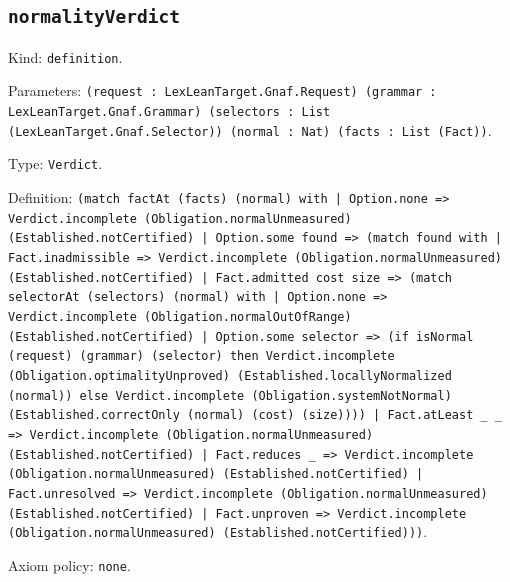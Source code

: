 \documentclass[11pt]{article}
\begin{document}
\subsection*{\texttt{normalityVerdict}}
\noindent Kind: \texttt{definition}.\par
\noindent Parameters: \texttt{(request : LexLeanTarget.Gnaf.Request) (grammar : LexLeanTarget.Gnaf.Grammar) (selectors : List (LexLeanTarget.Gnaf.Selector)) (normal : Nat) (facts : List (Fact))}.\par
\noindent Type: \texttt{Verdict}.\par
\noindent Definition: \texttt{(match factAt (facts) (normal) with | Option.none => Verdict.incomplete (Obligation.normalUnmeasured) (Established.notCertified) | Option.some found => (match found with | Fact.inadmissible => Verdict.incomplete (Obligation.normalUnmeasured) (Established.notCertified) | Fact.admitted cost size => (match selectorAt (selectors) (normal) with | Option.none => Verdict.incomplete (Obligation.normalOutOfRange) (Established.notCertified) | Option.some selector => (if isNormal (request) (grammar) (selector) then Verdict.incomplete (Obligation.optimalityUnproved) (Established.locallyNormalized (normal)) else Verdict.incomplete (Obligation.systemNotNormal) (Established.correctOnly (normal) (cost) (size)))) | Fact.atLeast \_ \_ => Verdict.incomplete (Obligation.normalUnmeasured) (Established.notCertified) | Fact.reduces \_ => Verdict.incomplete (Obligation.normalUnmeasured) (Established.notCertified) | Fact.unresolved => Verdict.incomplete (Obligation.normalUnmeasured) (Established.notCertified) | Fact.unproven => Verdict.incomplete (Obligation.normalUnmeasured) (Established.notCertified)))}.\par
\noindent Axiom policy: \texttt{none}.\par
\end{document}
